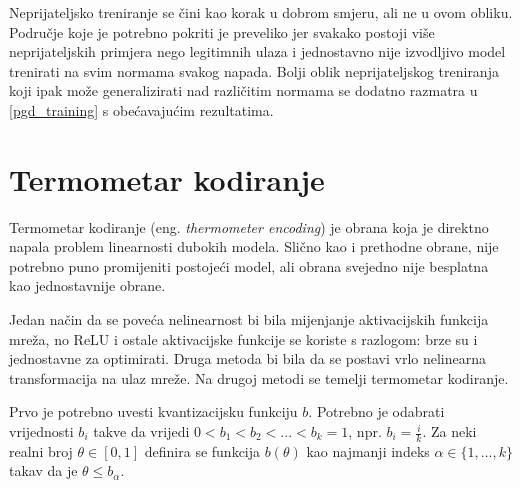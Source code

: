 \documentclass[utf8, diplomski]{fer}
\begin{document}
Neprijateljsko treniranje se čini kao korak u dobrom smjeru, ali ne u ovom obliku. Područje koje je potrebno pokriti je preveliko jer svakako postoji više neprijateljskih primjera nego legitimnih ulaza i jednostavno nije izvodljivo model trenirati na svim normama svakog napada. Bolji oblik neprijateljskog treniranja koji ipak može generalizirati nad različitim normama se dodatno razmatra u \ref{pgd_training} s obećavajućim rezultatima.

\section{Termometar kodiranje}
Termometar kodiranje (eng. \textit{thermometer encoding}) je obrana koja je direktno napala problem linearnosti dubokih modela\citep{thermometer_encoding}. Slično kao i prethodne obrane, nije potrebno puno promijeniti postojeći model, ali obrana svejedno nije besplatna kao jednostavnije obrane. \par
Jedan način da se poveća nelinearnost bi bila mijenjanje aktivacijskih funkcija mreža, no ReLU i ostale aktivacijske funkcije se koriste s razlogom: brze su i jednostavne za optimirati. Druga metoda bi bila da se postavi vrlo nelinearna transformacija na ulaz mreže. Na drugoj metodi se temelji termometar kodiranje. \par
Prvo je potrebno uvesti kvantizacijsku funkciju $b$. Potrebno je odabrati vrijednosti $b_{i}$ takve da vrijedi $0 < b_{1} < b_{2} < ... < b_{k} = 1$, npr. $b_{i} = \frac{i}{k}$. Za neki realni broj $\theta \in [0, 1]$ definira se funkcija $b(\theta)$ kao najmanji indeks $\alpha \in \{1, ..., k\}$ takav da je $\theta \leq b_{\alpha}$. \\
\end{document}
